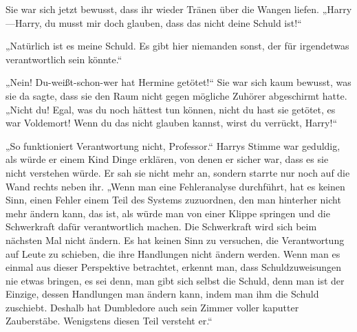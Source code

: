 Sie war sich jetzt bewusst, dass ihr wieder Tränen über die Wangen liefen.
„Harry—Harry, du musst mir doch glauben, dass das nicht deine Schuld ist!“

„Natürlich ist es meine Schuld. Es gibt hier niemanden sonst, der für irgendetwas verantwortlich sein könnte.“

„Nein! Du-weißt-schon-wer hat Hermine getötet!“ Sie war sich kaum bewusst, was sie da sagte, dass sie den Raum nicht gegen mögliche Zuhörer abgeschirmt hatte. „Nicht du! Egal, was du noch hättest tun können, nicht du hast sie getötet, es war Voldemort! Wenn du das nicht glauben kannst, wirst du verrückt, Harry!“

„So funktioniert Verantwortung nicht, Professor.“ Harrys Stimme war geduldig, als würde er einem Kind Dinge erklären, von denen er sicher war, dass es sie nicht verstehen würde. Er sah sie nicht mehr an, sondern starrte nur noch auf die Wand rechts neben ihr. „Wenn man eine Fehleranalyse durchführt, hat es keinen Sinn, einen Fehler einem Teil des Systems zuzuordnen, den man hinterher nicht mehr ändern kann, das ist, als würde man von einer Klippe springen und die Schwerkraft dafür verantwortlich machen. Die Schwerkraft wird sich beim nächsten Mal nicht ändern. Es hat keinen Sinn zu versuchen, die Verantwortung auf Leute zu schieben, die ihre Handlungen nicht ändern werden. Wenn man es einmal aus dieser Perspektive betrachtet, erkennt man, dass Schuldzuweisungen nie etwas bringen, es sei denn, man gibt sich selbst die Schuld, denn man ist der Einzige, dessen Handlungen man ändern kann, indem man ihm die Schuld zuschiebt. Deshalb hat Dumbledore auch sein Zimmer voller kaputter Zauberstäbe. Wenigstens diesen Teil versteht er.“

